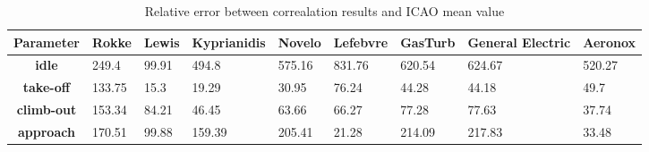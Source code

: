 \begin{table}[h!]
  \centering
  \begin{tabularx}{\textwidth}{||c|X|X|X|X|X|X|X|X||}
  \hline
    \cellcolor{gray!20}\textbf{Parameter} & \cellcolor{gray!20}\textbf{Rokke} & \cellcolor{gray!20}\textbf{Lewis} & \cellcolor{gray!20}\textbf{Kyprianidis} & \cellcolor{gray!20}\textbf{Novelo} & \cellcolor{gray!20}\textbf{Lefebvre} & \cellcolor{gray!20}\textbf{GasTurb} & \cellcolor{gray!20}\textbf{General Electric} & \cellcolor{gray!20}\textbf{Aeronox} \\ [0.5ex]
  \hline\hline
\centering
    \cellcolor{gray!20}\textbf{idle} & 249.4 & 99.91 & 494.8 & 575.16 & 831.76 & 620.54 & 624.67 & 520.27 \\
  \hline
    \cellcolor{gray!20}\textbf{take-off} & 133.75 & 15.3 & 19.29 & 30.95 & 76.24 & 44.28 & 44.18 & 49.7 \\
  \hline
    \cellcolor{gray!20}\textbf{climb-out} & 153.34 & 84.21 & 46.45 & 63.66 & 66.27 & 77.28 & 77.63 & 37.74 \\
  \hline
    \cellcolor{gray!20}\textbf{approach} & 170.51 & 99.88 & 159.39 & 205.41 & 21.28 & 214.09 & 217.83 & 33.48 \\
  \hline
  \end{tabularx}
  \caption{Relative error between correalation results and ICAO mean value}
  \label{tab:relec}
\end{table}
